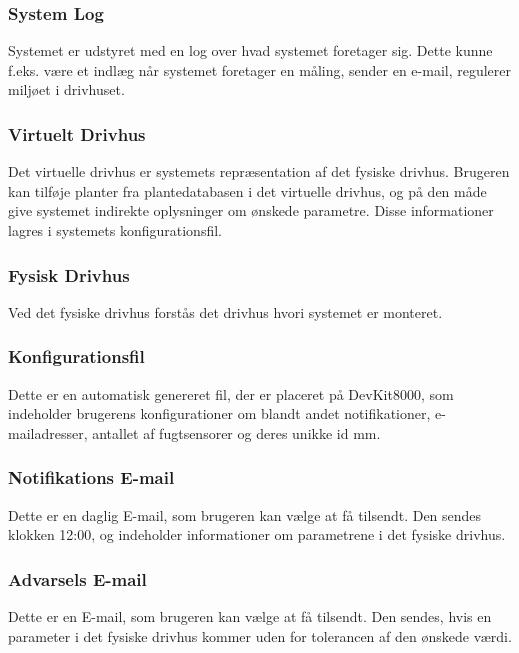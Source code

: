 \subsubsection{System Log}
Systemet er udstyret med en log over hvad systemet foretager sig. 
Dette kunne f.eks. være et indlæg når systemet foretager en måling, sender en e-mail, regulerer miljøet i drivhuset.
\subsubsection{Virtuelt Drivhus}
Det virtuelle drivhus er systemets repræsentation af det fysiske drivhus. Brugeren kan tilføje planter fra plantedatabasen i det virtuelle drivhus, og på den måde give systemet indirekte oplysninger om ønskede parametre.
Disse informationer lagres i systemets konfigurationsfil.
\subsubsection{Fysisk Drivhus}
Ved det fysiske drivhus forstås det drivhus hvori systemet er monteret. 
\subsubsection{Konfigurationsfil}
Dette er en automatisk genereret fil, der er placeret på DevKit8000, som indeholder brugerens konfigurationer om blandt andet notifikationer, e-mailadresser, antallet af fugtsensorer og deres unikke id mm.
\subsubsection{Notifikations E-mail}
Dette er en daglig E-mail, som brugeren kan vælge at få tilsendt. Den sendes klokken 12:00, og indeholder informationer om parametrene i det fysiske drivhus.
\subsubsection{Advarsels E-mail}
Dette er en E-mail, som brugeren kan vælge at få tilsendt. Den sendes, hvis en parameter i det fysiske drivhus kommer uden for tolerancen af den ønskede værdi.

